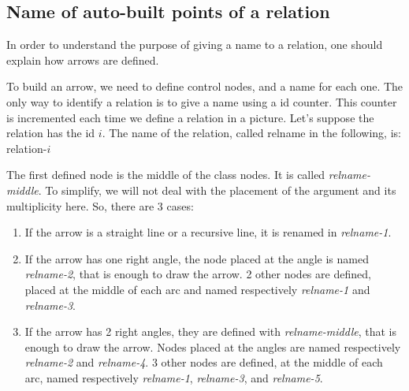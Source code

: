\documentclass[a4paper,11pt]{report}
\begin{document}
\medskip

\begin{minipage}{0.5\textwidth}
	
\end{minipage}
\begin{minipage}{0.4\textwidth}
	\begin{center}
	\end{center}
\end{minipage}

\subsection{Name of auto-built points of a relation}\label{ss.relptname}

In order to understand the purpose of giving a name to a relation, one should explain how arrows are defined.

To build an arrow, we need to define control nodes, and a name for each one. The only way to identify a relation is to give a name using a id counter. This counter is incremented each time we define a relation in a picture.
Let's suppose the relation has the id $i$. The name of the relation, called relname in the following, is: relation-$i$

The first defined node is the middle of the class nodes. It is called {\it relname-middle}. To simplify, we will not deal with the placement of the argument and its multiplicity here. So, there are 3 cases:

\begin{enumerate}
	\item If the arrow is a straight line or a recursive line, it is renamed in {\it relname-1}.

	      \begin{center}
	      \end{center}

	\item If the arrow has one right angle, the node placed at the angle is named {\it relname-2}, that is enough to draw the arrow. 2 other nodes are defined, placed at the middle of each arc and named respectively {\it relname-1} and {\it relname-3}.

	      \begin{center}
	      \end{center}

	\item If the arrow has 2 right angles, they are defined with
		      {\it relname-middle}, that is enough to draw the arrow. Nodes placed at the angles are named respectively {\it relname-2} and {\it relname-4}. 3 other nodes are defined, at the middle of each arc,
	      named respectively {\it relname-1}, {\it relname-3}, and {\it relname-5}.

	      \begin{center}
	      \end{center}
\end{enumerate}
\end{document}

